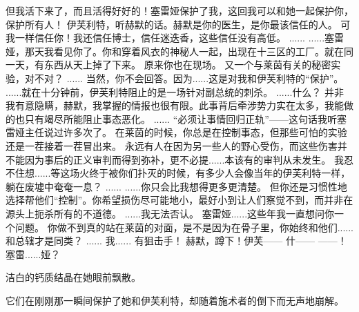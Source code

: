 \documentclass[openany]{book}
\begin{document}
\begin{dialogue}
     但我活下来了，而且活得好好的！塞雷娅保护了我，这回我可以和她一起保护你，保护所有人！
     伊芙利特，听赫默的话。赫默是你的医生，是你最该信任的人。
     可我一样信任你！我还信任博士，信任迷迭香，这些信任没有高低。
     ......
     ......塞雷娅，那天我看见你了。你和穿着风衣的神秘人一起，出现在十三区的工厂。就在同一天，有东西从天上掉了下来。
     原来你也在现场。
     又一个与莱茵有关的秘密实验，对不对？
     ......
     当然，你不会回答。因为......这是对我和伊芙利特的“保护”。
     ......就在十分钟前，伊芙利特阻止的是一场针对副总统的刺杀。
     ......什么？
     并非我有意隐瞒，赫默，我掌握的情报也很有限。此事背后牵涉势力实在太多，我能做的也只有竭尽所能阻止事态恶化。
     ......
     “必须让事情回归正轨”——这句话我听塞雷娅主任说过许多次了。
     在莱茵的时候，你总是在控制事态，但那些可怕的实验还是一茬接着一茬冒出来。
     永远有人在因为另一些人的野心受伤，而这些伤害并不能因为事后的正义审判而得到弥补，更不必提......本该有的审判从未发生。
     我忍不住想......等这场火终于被你们扑灭的时候，有多少人会像当年的伊芙利特一样，躺在废墟中奄奄一息？
     ......
     ......你只会比我想得更多更清楚。
     但你还是习惯性地选择帮他们“控制”。你希望损伤尽可能地小，最好小到让人们察觉不到，而并非在源头上扼杀所有的不道德。
     ......我无法否认。
     塞雷娅......这些年我一直想问你一个问题。
     你做不到真的站在莱茵的对面，是不是因为在骨子里，你始终和他们......和总辖才是同类？
     ......
     我......
     有狙击手！
     赫默，蹲下！伊芙——
     什——
     ——！
     塞雷......娅？\par
    洁白的钙质结晶在她眼前飘散。\par
    它们在刚刚那一瞬间保护了她和伊芙利特，却随着施术者的倒下而无声地崩解。
\end{dialogue}
\end{document}
